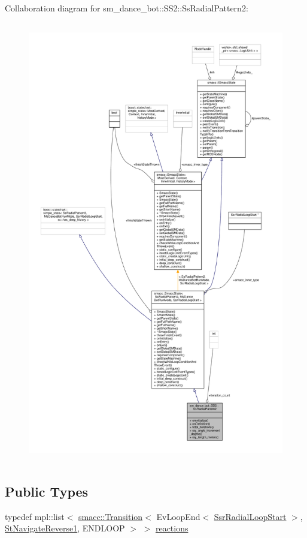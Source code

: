 Collaboration diagram for sm\+\_\+dance\+\_\+bot\+:\+:S\+S2\+:\+:Ss\+Radial\+Pattern2\+:\nopagebreak
\begin{figure}[H]
\begin{center}
\leavevmode
\includegraphics[height=550pt]{structsm__dance__bot_1_1SS2_1_1SsRadialPattern2__coll__graph}
\end{center}
\end{figure}
\subsection*{Public Types}
\begin{DoxyCompactItemize}
\item 
typedef mpl\+::list$<$ \hyperlink{classsmacc_1_1Transition}{smacc\+::\+Transition}$<$ Ev\+Loop\+End$<$ \hyperlink{structsm__dance__bot_1_1radial__motion__states_1_1SsrRadialLoopStart}{Ssr\+Radial\+Loop\+Start} $>$, \hyperlink{structsm__dance__bot_1_1StNavigateReverse1}{St\+Navigate\+Reverse1}, E\+N\+D\+L\+O\+OP $>$ $>$ \hyperlink{structsm__dance__bot_1_1SS2_1_1SsRadialPattern2_ab6b8f0227a267c7618f03efefe3fcf16}{reactions}
\end{DoxyCompactItemize}
